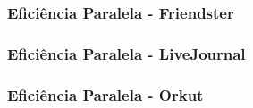 \documentclass{beamer}
\begin{document}
\begin{frame}
    \frametitle{Eficiência Paralela - Friendster}

    \begin{figure}
        \centering
    \end{figure}
\end{frame}

\begin{frame}
    \frametitle{Eficiência Paralela - LiveJournal}

    \begin{figure}
        \centering
    \end{figure}
\end{frame}

\begin{frame}
    \frametitle{Eficiência Paralela - Orkut}

    \begin{figure}
        \centering
    \end{figure}
\end{frame}
\end{document}
